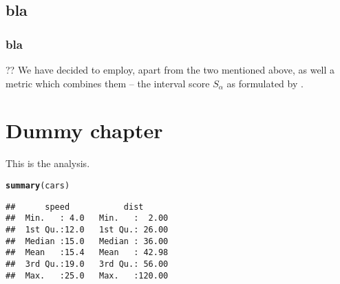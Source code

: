 \documentclass{ctuthesis}\usepackage[]{graphicx}\usepackage[]{color}
\makeatletter
\newcommand{\hlstd}[1]{\textcolor[rgb]{0.345,0.345,0.345}{#1}}%
\newcommand{\hlkwd}[1]{\textcolor[rgb]{0.737,0.353,0.396}{\textbf{#1}}}%
\newenvironment{kframe}{%
 \def\at@end@of@kframe{}%
 \ifinner\ifhmode%
  \def\at@end@of@kframe{\end{minipage}}%
  \begin{minipage}{\columnwidth}%
 \fi\fi%
 \def\FrameCommand##1{\hskip\@totalleftmargin \hskip-\fboxsep
 \colorbox{shadecolor}{##1}\hskip-\fboxsep
     \hskip-\linewidth \hskip-\@totalleftmargin \hskip\columnwidth}%
 \MakeFramed {\advance\hsize-\width
   \@totalleftmargin\z@ \linewidth\hsize
   \@setminipage}}%
 {\par\unskip\endMakeFramed%
 \at@end@of@kframe}
\newenvironment{knitrout}{}{} %
\makeatother
\begin{document}
\section{bla}

\subsection{bla}
?? We have decided to employ, apart from the two mentioned above,  as well a metric which combines them -- the interval score $S_\alpha$ as formulated by \cite{gneiting2007strictly}.
        


\chapter{Dummy chapter}
This is the analysis.

\begin{knitrout}
\color{fgcolor}\begin{kframe}
\begin{alltt}
\hlkwd{summary}\hlstd{(cars)}
\end{alltt}
\begin{verbatim}
##      speed           dist       
##  Min.   : 4.0   Min.   :  2.00  
##  1st Qu.:12.0   1st Qu.: 26.00  
##  Median :15.0   Median : 36.00  
##  Mean   :15.4   Mean   : 42.98  
##  3rd Qu.:19.0   3rd Qu.: 56.00  
##  Max.   :25.0   Max.   :120.00
\end{verbatim}
\end{kframe}
\end{knitrout}
      
    

        \small
         
        
    
\end{document}
